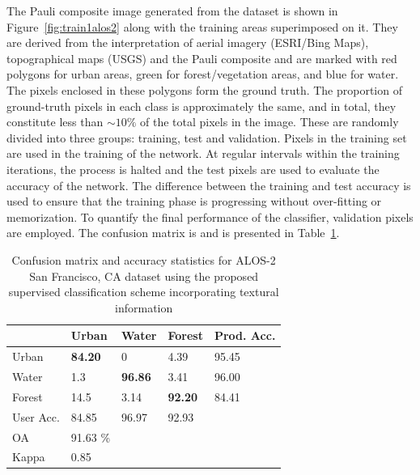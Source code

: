 The Pauli composite image generated from the dataset is shown in Figure~\ref{fig:train1alos2} along with the training areas superimposed on it. They are derived from the interpretation of aerial imagery (ESRI/Bing Maps), topographical maps (USGS) and the Pauli composite and are marked with red polygons for urban areas, green for forest/vegetation areas, and blue for water. The pixels enclosed in these polygons form the ground truth. The proportion of ground-truth pixels in each class is approximately the same, and in total, they constitute less than $\sim10\%$ of the total pixels in the image. These are randomly divided into three groups: training, test and validation. Pixels in the training set are used in the training of the network. At regular intervals within the training iterations, the process is halted and the test pixels are used to evaluate the accuracy of the network. The difference between the training and test accuracy is used to ensure that the training phase is progressing without over-fitting or memorization. To quantify the final performance of the classifier, validation pixels are employed. The confusion matrix is and is presented in Table~\ref{tab:alos2tab}.













\begin{table}[t]
	\caption{Confusion matrix and accuracy statistics for ALOS-2 San Francisco, CA dataset using the proposed supervised classification scheme incorporating textural information}
	\label{tab:alos2tab}
	\begin{tabularx}{\columnwidth}{X|XXX|X}
		& Urban & Water  & Forest & Prod. Acc. \\ \hline
		Urban & \bf{84.20} & 0 & 4.39 & 95.45  \\
		Water & 1.3 & \bf{96.86} & 3.41 & 96.00 \\
		Forest & 14.5 & 3.14 & \bf{92.20} & 84.41\\ \hline 
		User Acc. & 84.85 & 96.97 &   92.93 & \\ \hline
		OA &  91.63 \% & & &  \\
		Kappa & 0.85 & & &  \\
	\end{tabularx}
\end{table}


